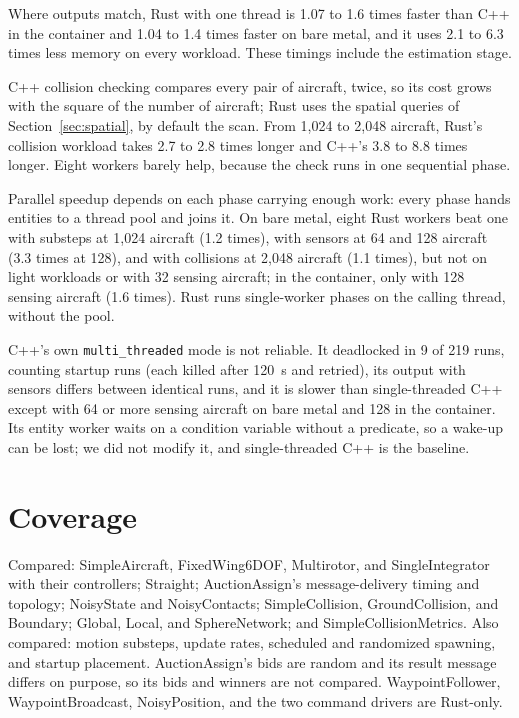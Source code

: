 \documentclass[conference]{IEEEtran}
\begin{document}
Where outputs match, Rust with one thread is 1.07 to 1.6 times faster than C++
in the container and 1.04 to 1.4 times faster on bare metal, and it uses 2.1 to
6.3 times less memory on every workload. These timings include the estimation
stage.

C++ collision checking compares every pair of aircraft, twice, so its cost
grows with the square of the number of aircraft; Rust uses the spatial queries
of Section~\ref{sec:spatial}, by default the scan. From 1{,}024 to 2{,}048
aircraft, Rust's collision workload takes 2.7 to 2.8 times longer and C++'s 3.8
to 8.8 times longer. Eight workers barely help, because the check runs in one
sequential phase.

Parallel speedup depends on each phase carrying enough work: every phase hands
entities to a thread pool and joins it. On bare metal, eight Rust workers beat
one with substeps at 1{,}024 aircraft (1.2 times), with sensors at 64 and 128
aircraft (3.3 times at 128), and with collisions at 2{,}048 aircraft (1.1
times), but not on light workloads or with 32 sensing aircraft; in the
container, only with 128 sensing aircraft (1.6 times). Rust runs single-worker
phases on the calling thread, without the pool.

C++'s own \texttt{multi\_threaded} mode is not reliable. It deadlocked in 9 of 219
runs, counting startup runs (each killed after 120~s and retried), its output
with sensors differs between identical runs, and it is slower than
single-threaded C++ except with 64 or more sensing aircraft on bare metal and
128 in the container. Its entity
worker waits on a condition variable without a predicate,
so a wake-up can be lost; we did not modify it, and single-threaded C++ is the
baseline.


\section{Coverage}
\label{app:coverage}

Compared: SimpleAircraft, FixedWing6DOF, Multirotor, and SingleIntegrator with
their controllers; Straight; AuctionAssign's message-delivery timing and
topology; NoisyState and
NoisyContacts; SimpleCollision, GroundCollision, and Boundary; Global, Local,
and SphereNetwork; and SimpleCollisionMetrics. Also compared: motion substeps,
update rates, scheduled and randomized spawning, and startup placement.
AuctionAssign's bids are random and its result message differs on purpose, so
its bids and winners are not compared. WaypointFollower, WaypointBroadcast,
NoisyPosition,
and the two command drivers are Rust-only.
\end{document}
